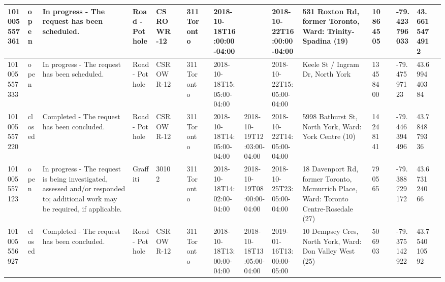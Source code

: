 \documentclass[11pt,a4paper]{article}
\begin{document}
\begin{table}[h]
\begin{tabular}{|l|l|l|l|l|l|l|l|l|l|l|l|l|l|l|l|l|}
101005557361 & open & In progress - The request has been scheduled. & Road - Pot hole & CSROWR-12 &  & 311 Toronto &  & 2018-10-18T16:00:00-04:00 &  & 2018-10-22T16:00:00-04:00 & 531 Roxton Rd, former Toronto, Ward: Trinity-Spadina (19) & 10864505 &  & -79.423796033 & 43.6615474912 &  \\ \hline
101005557333 & open & In progress - The request has been scheduled. & Road - Pot hole & CSROWR-12 &  & 311 Toronto &  & 2018-10-18T15:05:00-04:00 &  & 2018-10-22T15:05:00-04:00 & Keele St / Ingram Dr, North York & 13458400 &  & -79.47597123 & 43.699440384 &  \\ \hline
101005557220 & closed & Completed - The request has been concluded. & Road - Pot hole & CSROWR-12 &  & 311 Toronto &  & 2018-10-18T14:05:00-04:00 & 2018-10-19T12:03:00-04:00 & 2018-10-22T14:05:00-04:00 & 5998 Bathurst St, North York, Ward: York Centre (10) & 14248141 &  & -79.446394496 & 43.784879336 &  \\ \hline
101005557123 & open & In progress - The request is being investigated, assessed and/or responded to; additional work may be required, if applicable. & Graffiti & 30102 &  & 311 Toronto &  & 2018-10-18T14:02:00-04:00 & 2018-10-19T08:00:00-04:00 & 2018-10-25T23:05:00-04:00 & 18 Davenport Rd, former Toronto, Mcmurrich Place, Ward: Toronto Centre-Rosedale (27) & 790565 &  & -79.388729172 & 43.673124066 &  \\ \hline
101005556927 & closed & Completed - The request has been concluded. & Road - Pot hole & CSROWR-12 &  & 311 Toronto &  & 2018-10-18T13:00:00-04:00 & 2018-10-18T13:05:00-04:00 & 2019-01-16T13:00:00-05:00 & 10 Dempsey Cres, North York, Ward: Don Valley West (25) & 506903 &  & -79.375142922 & 43.754010592 &  \\ \hline
\end{tabular}
\end{table}
\end{document}
